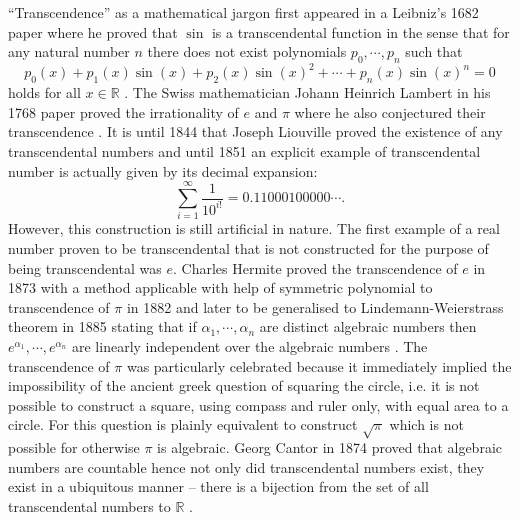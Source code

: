 \documentclass{report}
\theoremstyle{definition}
\theoremstyle{plain}
\begin{document}
``Transcendence'' as a mathematical jargon first appeared in a Leibniz's 1682 paper where he proved that $\sin$ is a transcendental function in the sense that for any natural number $n$ there does not exist polynomials $p_0,\cdots,p_n$ such that
$$p_0(x)+p_1(x)\sin(x)+p_2(x)\sin(x)^2+\cdots+p_n(x)\sin(x)^n=0$$
holds for all $x\in\mathbb R$ \cite{bourbaki1998elements}. The Swiss mathematician Johann Heinrich Lambert in his 1768 paper proved the irrationality of $e$ and $\pi$ where he also conjectured their transcendence \cite{lambert2004memoire}. It is until 1844 that Joseph Liouville proved the existence of any transcendental numbers and until 1851 an explicit example of transcendental number is actually given by its decimal expansion:\cite{10.2307/1988833}
$$\sum_{i=1}^\infty\frac1{10^{i!}}=0.11000100000\cdots.$$
However, this construction is still artificial in nature. The first example of a real number proven to be transcendental that is not constructed for the purpose of being transcendental was $e$. Charles Hermite proved the transcendence of $e$ in 1873 with a method applicable with help of symmetric polynomial to transcendence of $\pi$ in 1882 and later to be generalised to Lindemann-Weierstrass theorem in 1885 stating that if $\alpha_1,\cdots, \alpha_n$ are distinct algebraic numbers then $e^{\alpha_1},\cdots,e^{\alpha_n}$ are linearly independent over the algebraic numbers \cite{baker1990transcendental}. The transcendence of $\pi$ was particularly celebrated because it immediately implied the impossibility of the ancient greek question of squaring the circle, i.e. it is not possible to construct a square, using compass and ruler only, with equal area to a circle. For this question is plainly equivalent to construct $\sqrt\pi$ which is not possible for otherwise $\pi$ is algebraic. Georg Cantor in 1874 proved that algebraic numbers are countable hence not only did transcendental numbers exist, they exist in a ubiquitous manner -- there is a bijection from the set of all transcendental numbers to $\mathbb R$ \cite{cantor1932uber,cantor1878beitrag}.
\end{document}

